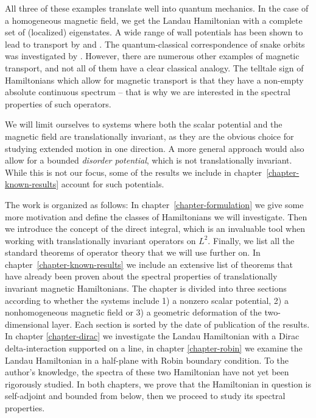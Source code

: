 All three of these examples translate well into quantum mechanics. In the case of a homogeneous magnetic field, we get the Landau Hamiltonian with a complete set of (localized) eigenstates. A wide range of wall potentials has been shown to lead to transport by \cite{Macris1999} and \cite{Frohlich2000}. The quantum-classical correspondence of snake orbits was investigated by \cite{Reijniers2000}. However, there are numerous other examples of magnetic transport, and not all of them have a clear classical analogy. The telltale sign of Hamiltonians which allow for magnetic transport is that they have a non-empty absolute continuous spectrum – that is why we are interested in the spectral properties of such operators.

We will limit ourselves to systems where both the scalar potential and the magnetic field are translationally invariant, as they are the obvious choice for studying extended motion in one direction. A more general approach would also allow for a bounded \textit{disorder potential}, which is not translationally invariant. While this is not our focus, some of the results we include in chapter~\ref{chapter-known-results} account for such potentials.

The work is organized as follows: In chapter~\ref{chapter-formulation} we give some more motivation and define the classes of Hamiltonians we will investigate. Then we introduce the concept of the direct integral, which is an invaluable tool when working with translationally invariant operators on $L^2$. Finally, we list all the standard theorems of operator theory that we will use further on. In chapter~\ref{chapter-known-results} we include an extensive list of theorems that have already been proven about the spectral properties of translationally invariant magnetic Hamiltonians. The chapter is divided into three sections according to whether the systems include 1) a nonzero scalar potential, 2) a nonhomogeneous magnetic field or 3) a geometric deformation of the two-dimensional layer. Each section is sorted by the date of publication of the results. In chapter \ref{chapter-dirac} we investigate the Landau Hamiltonian with a Dirac delta-interaction supported on a line, in chapter \ref{chapter-robin} we examine the Landau Hamiltonian in a half-plane with Robin boundary condition. To the author's knowledge, the spectra of these two Hamiltonian have not yet been rigorously studied. In both chapters, we prove that the Hamiltonian in question is self-adjoint and bounded from below, then we proceed to study its spectral properties.
